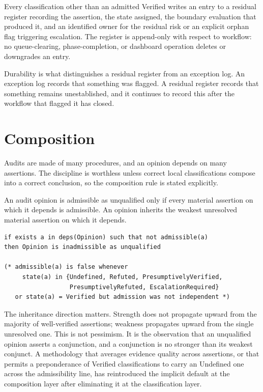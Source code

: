\documentclass[smallcondensed,envcountsect,natbib]{svjour3}
\newcommand{\state}[1]{\textsf{#1}}
\begin{document}
\begin{definition}
\label{def:register}
Every classification other than an admitted \state{Verified} writes an entry to a residual register recording the assertion, the state assigned, the boundary evaluation that produced it, and an identified owner for the residual risk or an explicit orphan flag triggering escalation. The register is append-only with respect to workflow: no queue-clearing, phase-completion, or dashboard operation deletes or downgrades an entry.
\end{definition}

Durability is what distinguishes a residual register from an exception log. An exception log records that something was flagged. A residual register records that something remains unestablished, and it continues to record this after the workflow that flagged it has closed.

\section{Composition}
\label{sec:composition}

Audits are made of many procedures, and an opinion depends on many assertions. The discipline is worthless unless correct local classifications compose into a correct conclusion, so the composition rule is stated explicitly.

\begin{rul}[Composition]
\label{rule:composition}
An audit opinion is admissible as unqualified only if every material assertion on which it depends is admissible. An opinion inherits the weakest unresolved material assertion on which it depends.
\end{rul}

\begin{lstlisting}
if exists a in deps(Opinion) such that not admissible(a)
then Opinion is inadmissible as unqualified

(* admissible(a) is false whenever
     state(a) in {Undefined, Refuted, PresumptivelyVerified,
                  PresumptivelyRefuted, EscalationRequired}
   or state(a) = Verified but admission was not independent *)
\end{lstlisting}

The inheritance direction matters. Strength does not propagate upward from the majority of well-verified assertions; weakness propagates upward from the single unresolved one. This is not pessimism. It is the observation that an unqualified opinion asserts a conjunction, and a conjunction is no stronger than its weakest conjunct. A methodology that averages evidence quality across assertions, or that permits a preponderance of \state{Verified} classifications to carry an \state{Undefined} one across the admissibility line, has reintroduced the implicit default at the composition layer after eliminating it at the classification layer.
\end{document}
